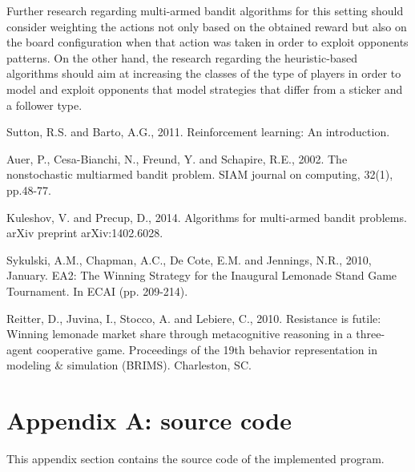 \documentclass[runningheads]{llncs}
\begin{document}
Further research regarding multi-armed bandit algorithms for this
setting should consider weighting the actions not only based on the
obtained reward but also on the board configuration when that action
was taken in order to exploit opponents patterns. On the other hand,
the research regarding the heuristic-based algorithms should aim at
increasing the classes of the type of players in order to model and
exploit opponents that model strategies that differ from a sticker and
a follower type.


\begin{thebibliography}{8}

Sutton, R.S. and Barto, A.G., 2011. Reinforcement learning: An
introduction.

Auer, P., Cesa-Bianchi, N., Freund, Y. and Schapire, R.E., 2002. The
nonstochastic multiarmed bandit problem. SIAM journal on computing,
32(1), pp.48-77.

Kuleshov, V. and Precup, D., 2014. Algorithms for multi-armed bandit
problems. arXiv preprint arXiv:1402.6028.

Sykulski, A.M., Chapman, A.C., De Cote, E.M. and Jennings, N.R., 2010,
January. EA2: The Winning Strategy for the Inaugural Lemonade Stand
Game Tournament. In ECAI (pp. 209-214).

Reitter, D., Juvina, I., Stocco, A. and Lebiere, C., 2010. Resistance
is futile: Winning lemonade market share through metacognitive
reasoning in a three-agent cooperative game. Proceedings of the 19th
behavior representation in modeling \& simulation (BRIMS). Charleston,
SC.
  
\end{thebibliography}

\section{Appendix A: source code}\label{appendix}
This appendix section contains the source code of the implemented program.

\end{document}
